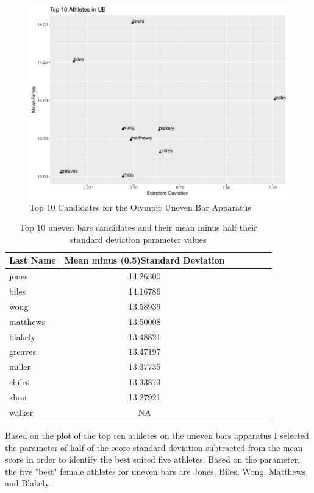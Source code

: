 \documentclass[12pt]{article}
\begin{document}
\begin{figure}[tbp]
  \centering
  \includegraphics[scale=0.6]{Top10AthletesUB.pdf}
  \caption{Top 10 Candidates for the Olympic Uneven Bar Apparatus}
  \label{fig:UB}
\end{figure}

\begin{table}[tbp]
  \caption{Top 10 uneven bars candidates and their mean minus half their standard deviation parameter values}
  \label{tab:tableUBP}
\centering
\begin{tabular}[t]{lccllll}
 \toprule
Last Name & Mean minus (0.5)Standard Deviation\\
\midrule
jones & 14.26300\\
\midrule
biles & 14.16786\\
\midrule
wong & 13.58939\\
\midrule
matthews & 13.50008\\
\midrule
blakely & 13.48821\\
\midrule
greaves & 13.47197\\
\midrule
miller & 13.37735\\
\midrule
chiles & 13.33873\\
\midrule
zhou & 13.27921\\
\midrule
walker & NA\\
\bottomrule
\end{tabular}
\end{table}

Based on the plot of the top ten athletes on the uneven bars apparatus I selected the parameter of 
half of the score standard deviation subtracted from the mean score in order to identify the best suited five 
athletes. Based on the parameter, the five "best" female athletes for uneven bars are Jones, Biles, Wong, 
Matthews, and Blakely.
\end{document}
